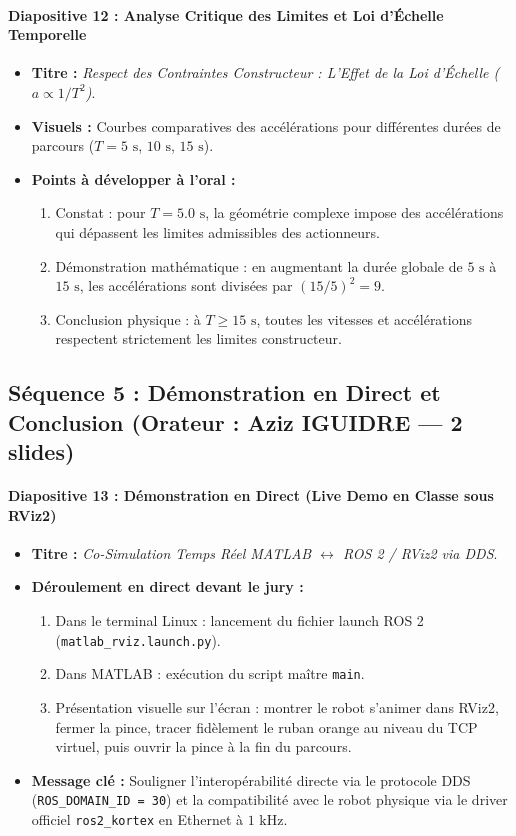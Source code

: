 \documentclass[11pt,a4paper]{report}
\begin{document}
\paragraph{Diapositive 12 : Analyse Critique des Limites et Loi d'Échelle Temporelle}
\begin{itemize}
    \item \textbf{Titre :} \textit{Respect des Contraintes Constructeur : L'Effet de la Loi d'Échelle ($a \propto 1/T^2$)}.
    \item \textbf{Visuels :} Courbes comparatives des accélérations pour différentes durées de parcours ($T = 5\text{ s}$, $10\text{ s}$, $15\text{ s}$).
    \item \textbf{Points à développer à l'oral :}
    \begin{enumerate}
        \item Constat : pour $T = 5.0\text{ s}$, la géométrie complexe impose des accélérations qui dépassent les limites admissibles des actionneurs.
        \item Démonstration mathématique : en augmentant la durée globale de $5\text{ s}$ à $15\text{ s}$, les accélérations sont divisées par $(15/5)^2 = 9$.
        \item Conclusion physique : à $T \ge 15\text{ s}$, toutes les vitesses et accélérations respectent strictement les limites constructeur.
    \end{enumerate}
\end{itemize}

\subsection{Séquence 5 : Démonstration en Direct et Conclusion (Orateur : Aziz IGUIDRE — 2 slides)}

\paragraph{Diapositive 13 : Démonstration en Direct (Live Demo en Classe sous RViz2)}
\begin{itemize}
    \item \textbf{Titre :} \textit{Co-Simulation Temps Réel MATLAB $\longleftrightarrow$ ROS 2 / RViz2 via DDS}.
    \item \textbf{Déroulement en direct devant le jury :}
    \begin{enumerate}
        \item Dans le terminal Linux : lancement du fichier launch ROS 2 (\texttt{matlab\_rviz.launch.py}).
        \item Dans MATLAB : exécution du script maître \texttt{main}.
        \item Présentation visuelle sur l'écran : montrer le robot s'animer dans RViz2, fermer la pince, tracer fidèlement le ruban orange au niveau du TCP virtuel, puis ouvrir la pince à la fin du parcours.
    \end{enumerate}
    \item \textbf{Message clé :} Souligner l'interopérabilité directe via le protocole DDS (\texttt{ROS\_DOMAIN\_ID = 30}) et la compatibilité avec le robot physique via le driver officiel \texttt{ros2\_kortex} en Ethernet à $1\text{ kHz}$.
\end{itemize}
\end{document}
